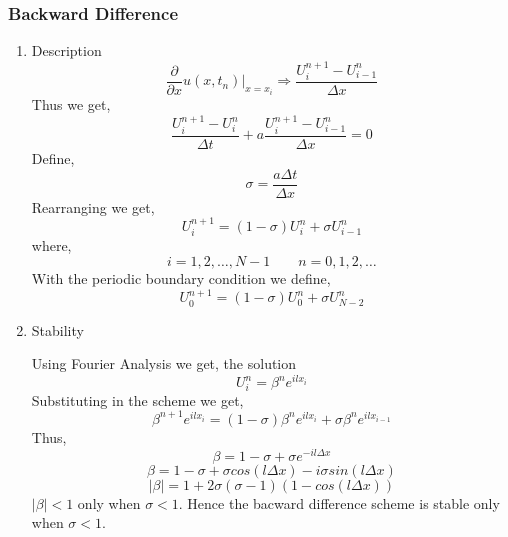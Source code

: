 \documentclass[11pt]{article}
\begin{document}
\subsubsection{Backward Difference}
\label{sec:orgbf50a0b}
\begin{enumerate}
\item Description
\label{sec:org81755d0}
$$\frac{\partial}{\partial x} u(x,t_n) \bigg|_{x=x_i} \Rightarrow \frac{U_i^{n+1} - U_{i-1}^n}{\Delta x}$$
Thus we get,
$$\frac{U_i^{n+1} - U_i^n}{\Delta t} + a \frac{U_i^{n+1} - U_{i-1}^n}{\Delta x} = 0$$
Define,
$$\sigma = \frac{a \Delta t}{\Delta x}$$
Rearranging we get,
$$U_i^{n+1} = \left( 1 - \sigma \right) U_i^n + \sigma U_{i-1}^n$$
where,
$$i=1,2,\ldots,N-1 \qquad n = 0,1,2,\ldots$$
With the periodic boundary condition we define,
$$U_{0}^{n+1} = \left( 1 - \sigma \right) U_{0}^n + \sigma U_{N-2}^n$$
\item Stability
\label{sec:orgf11211b}

Using Fourier Analysis we get, the solution
$$U_i^n = \beta^n e^{i l x_i}$$
Substituting in the scheme we get,
$$\beta^{n+1} e^{i l x_i} = \left( 1 - \sigma \right) \beta^n e^{i l x_i} + \sigma \beta^n e^{i l x_{i-1}}$$
Thus,
$$\beta = 1 - \sigma + \sigma e^{- i l \Delta x}$$
$$\beta = 1 - \sigma + \sigma cos(l \Delta x) - i \sigma sin(l \Delta x)$$
$$\lvert \beta \rvert = 1 + 2 \sigma \left( \sigma -1 \right) \left( 1 - cos(l \Delta x) \right)$$
\(\lvert \beta \rvert < 1\) only when \(\sigma < 1\). Hence the bacward difference scheme is stable only when \(\sigma < 1\).
\end{enumerate}
\end{document}
